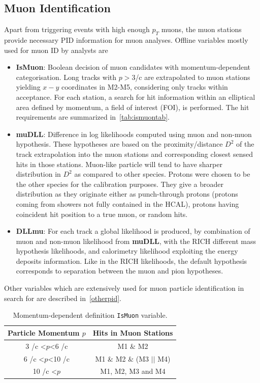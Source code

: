 \subsection{Muon Identification }
\label{muonID}
Apart from triggering events with high enough $p_{T}$ muons, the muon stations provide necessary \gls{PID} information for muon analyses. Offline variables mostly used for muon ID by analysts are
\begin{itemize}
	\item{\textbf{IsMuon}: Boolean decision of muon candidates with momentum-dependent categorisation. Long tracks with $p>3$\gev/c are extrapolated to muon stations yielding $x-y$ coordinates in M2-M5, considering only tracks within acceptance. For each station, a search for hit information within an elliptical area defined by momentum, a field of interest (\Gls{FOI}), is performed. The hit requirements are summarized in~\autoref{tab:ismuontab}.}
	\item{\textbf{muDLL}: Difference in log likelihoods computed using muon and non-muon hypothesis. These hypotheses are based on the proximity/distance $D^{2}$ of the track extrapolation into the muon stations and corresponding closest sensed hits in those stations. Muon-like particle will tend to have sharper distribution in $D^{2}$ as compared to other species. Protons were chosen to be the other species for the calibration purposes. They give a broader distribution as they originate either as punch-through protons (protons coming from showers not fully contained in the \gls{HCAL}), protons having coincident hit position to a true muon, or random hits.}
	\item{\textbf{DLLmu}}:  For each track a global likelihood is produced, by combination of muon and non-muon likelihood from \textbf{muDLL}, with the \Gls{RICH} different mass hypothesis likelihoods, and calorimetry likelihood exploiting the energy deposits information. Like in the \Gls{RICH} likelihoods, the default hypothesis corresponds to separation between the muon and pion hypotheses.    

\end{itemize}

\noindent Other variables which are extensively used for muon particle identification in search for \Bmumumu are described in~\autoref{otherpid}. 

\begin{table}[!h]
	\centering
	\hspace*{-0.8cm}
	\begin{tabular}{c c}
		\toprule
		Particle Momentum $p$  & Hits in Muon Stations \\ \hline
		3 \gev/c <$p$<6 \gev/c & M1 $\&$ M2\\
		6 \gev/c <$p$<10 \gev/c & M1 $\&$ M2 $\&$ (M3 $||$ M4) \\
		10 \gev/c <$p$ & M1, M2, M3 and M4 \\ \bottomrule      
	\end{tabular}
	\caption{Momentum-dependent definition \texttt{IsMuon} variable.}
	\label{tab:ismuontab}
\end{table}   


